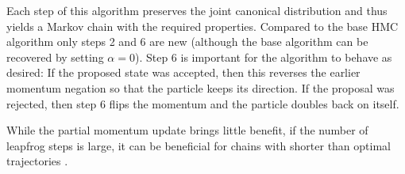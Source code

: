 Each step of this algorithm preserves the joint canonical distribution and thus yields a Markov chain with the required properties. Compared to the base HMC algorithm only steps 2 and 6 are new (although the base algorithm can be recovered by setting $\alpha = 0$). Step 6 is important for the algorithm to behave as desired: If the proposed state was accepted, then this reverses the earlier momentum negation so that the particle keeps its direction. If the proposal was rejected, then step 6 flips the momentum and the particle doubles back on itself.

While the partial momentum update brings little benefit, if the number of leapfrog steps is large, it can be beneficial for chains with shorter than optimal trajectories \parencite{Neal2011}.
